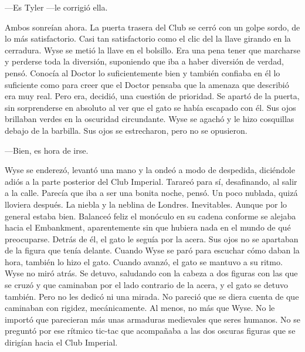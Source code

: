 {---Es Tyler ---le corrigió ella.}

{Ambos sonreían ahora. La puerta trasera del Club se cerró con un golpe
	sordo, de lo más satisfactorio. Casi tan satisfactorio como el clic del
	la llave girando en la cerradura. Wyse se metió la llave en el bolsillo.
	Era una pena tener que marcharse y perderse toda la diversión,
	suponiendo que iba a haber diversión de verdad, pensó. Conocía al Doctor
	lo suficientemente bien y también confiaba en él lo suficiente como para
	creer que el Doctor pensaba que la amenaza que describió era muy real.
	Pero era, decidió, una cuestión de prioridad. Se apartó de la puerta,
	sin sorprenderse en absoluto al ver que el gato se había escapado con
	él. Sus ojos brillaban verdes en la oscuridad circundante. Wyse se
	agachó y le hizo cosquillas debajo de la barbilla. Sus ojos se
estrecharon, pero no se opusieron.}

{---Bien, es hora de irse.}

{Wyse se enderezó, levantó una mano y la ondeó a modo de despedida,
	diciéndole adiós a la parte posterior del Club Imperial. Tarareó para
	sí, desafinando, al salir a la calle. Parecía que iba a ser una bonita
	noche, pensó. Un poco nublada, quizá lloviera después. La niebla y la
	neblina de Londres. Inevitables. Aunque por lo general estaba bien.
	Balanceó feliz el monóculo en su cadena conforme se alejaba hacia el
	Embankment, aparentemente sin que hubiera nada en el mundo de qué
	preocuparse. Detrás de él, el gato le seguía por la acera. Sus ojos no
	se apartaban de la figura que tenía delante. Cuando Wyse se paró para
	escuchar cómo daban la hora, también lo hizo el gato. Cuando avanzó, el
	gato se mantuvo a su ritmo. Wyse no miró atrás. Se detuvo, saludando con
	la cabeza a dos figuras con las que se cruzó y que caminaban por el lado
	contrario de la acera, y el gato se detuvo también. Pero no les dedicó
	ni una mirada. No pareció que se diera cuenta de que caminaban con
	rigidez, mecánicamente. Al menos, no más que Wyse. No le importó que
	parecieran más unas armaduras medievales que seres humanos. No se
	preguntó por ese rítmico tic-tac que acompañaba a las dos oscuras
figuras que se dirigían hacia el Club Imperial.}
